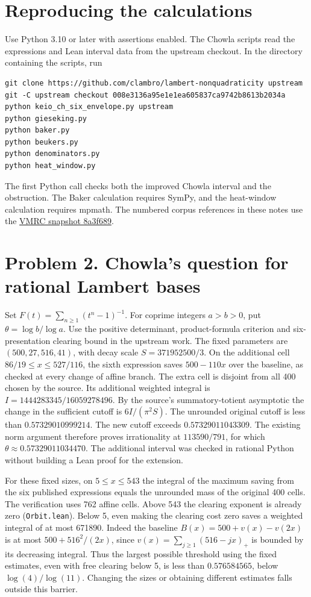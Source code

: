 \documentclass[11pt,a4paper]{article}
\begin{document}
\section{Reproducing the calculations}
Use Python 3.10 or later with assertions enabled. The Chowla scripts read the expressions and Lean interval data from the upstream checkout. In the directory containing the scripts, run
\begin{Verbatim}[fontsize=\small]
git clone https://github.com/clambro/lambert-nonquadraticity upstream
git -C upstream checkout 008e3136a95e1e1ea605837ca9742b8613b2034a
python keio_ch_six_envelope.py upstream
python gieseking.py
python baker.py
python beukers.py
python denominators.py
python heat_window.py
\end{Verbatim}
The first Python call checks both the improved Chowla interval and the obstruction. The Baker calculation requires SymPy, and the heat-window calculation requires mpmath. The numbered corpus references in these notes use the \href{https://github.com/QEEDDD/Verifiable-Mathematical-Reasoning-Corpus/tree/8a3f6895d0b9b9f125e43157e4a003a2a2b51704}{VMRC snapshot 8a3f689}.

\section{Problem 2. Chowla's question for rational Lambert bases}
Set $F(t)=\sum_{n\ge1}(t^n-1)^{-1}$. For coprime integers $a>b>0$, put $\theta=\log b/\log a$. Use the positive determinant, product-formula criterion and six-presentation clearing bound in the upstream work. The fixed parameters are $(500,27,516,41)$, with decay scale $S=371952500/3$. On the additional cell $86/19\le x\le527/116$, the sixth expression saves $500-110x$ over the baseline, as checked at every change of affine branch. The extra cell is disjoint from all 400 chosen by the source. Its additional weighted integral is $I=1444283345/16059278496$. By the source's summatory-totient asymptotic the change in the sufficient cutoff is $6I/(\pi^2 S)$. The unrounded original cutoff is less than $0.57329010999214$. The new cutoff exceeds $0.57329011043309$. The existing norm argument therefore proves irrationality at $113590/791$, for which $\theta\approx0.57329011034470$. The additional interval was checked in rational Python without building a Lean proof for the extension.

For these fixed sizes, on $5\le x\le543$ the integral of the maximum saving from the six published expressions equals the unrounded mass of the original 400 cells. The verification uses 762 affine cells. Above 543 the clearing exponent is already zero (\texttt{Orbit.lean}). Below 5, even making the clearing cost zero saves a weighted integral of at most 671890. Indeed the baseline $B(x)=500+v(x)-v(2x)$ is at most $500+516^2/(2x)$, since $v(x)=\sum_{j\ge1}(516-jx)_+$ is bounded by its decreasing integral. Thus the largest possible threshold using the fixed estimates, even with free clearing below 5, is less than $0.576584565$, below $\log(4)/\log(11)$. Changing the sizes or obtaining different estimates falls outside this barrier.
\end{document}
